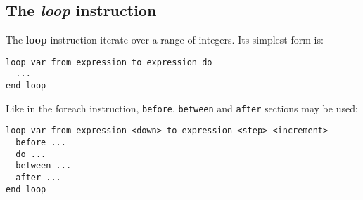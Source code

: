 \documentclass[11pt]{article}
\begin{document}
\subsection{The {\em loop} instruction}

The {\bf loop} instruction iterate over a range of integers. Its simplest form is:

\begin{lstlisting}
loop var from expression to expression do
  ...
end loop
\end{lstlisting}

Like in the foreach instruction, {\tt before},  {\tt between} and  {\tt after} sections may be used:

\begin{lstlisting}
loop var from expression <down> to expression <step> <increment>
  before ...
  do ...
  between ...
  after ...
end loop
\end{lstlisting}
\end{document}
